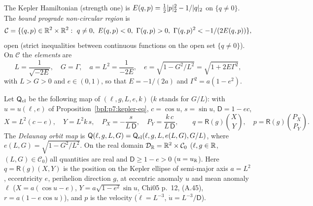 \begin{definition}\label{bpI:p7:elements}
The Kepler Hamiltonian (strength one) is $E(q,p)=\tfrac12\lvert p\rvert_2^2-1/\lvert q\rvert_2$ on $\{q\ne0\}$. The \emph{bound prograde non-circular region} is
\[
\mathcal C=\{(q,p)\in\R^2\times\R^2:\ q\ne0,\ E(q,p)<0,\ \Gamma(q,p)>0,\ \Gamma(q,p)^2<-1/(2E(q,p))\},
\]
open (strict inequalities between continuous functions on the open set $\{q\ne0\}$). On $\mathcal C$ the \emph{elements} are
\[
L=\frac1{\sqrt{-2E}},\quad G=\Gamma,\quad a=L^2=\frac1{-2E},\quad e=\sqrt{1-G^2/L^2}=\sqrt{1+2E\Gamma^2},
\]
with $L>G>0$ and $e\in(0,1)$,
so that $E=-1/(2a)$ and $\Gamma^2=a(1-e^2)$.
\end{definition}

\begin{definition}\label{bpI:p7:orbit-maps}
Let $\mathsf Q_{\rm el}$ be the following map of $(\ell,g,L,e,k)$ ($k$ stands for $G/L$): with $u=u(\ell,e)$ of Proposition~\ref{bpI:p7:kepler-eq}, $c=\cos u$, $s=\sin u$, $\mathsf D=1-ec$,
\[
X=L^2(c-e),\quad Y=L^2k\,s,\quad P_X=-\frac{s}{L\,\mathsf D},\quad P_Y=\frac{k\,c}{L\,\mathsf D},\qquad
q=\mathsf R(g)\binom XY,\quad p=\mathsf R(g)\binom{P_X}{P_Y}.
\]
The \emph{Delaunay orbit map} is $\mathsf Q(\ell,g,L,G)=\mathsf Q_{\rm el}(\ell,g,L,e(L,G),G/L)$, where $e(L,G)=\sqrt{1-G^2/L^2}$. On the real domain $\mathcal D_{\mathbb{R}}=\mathbb{R}^2\times\mathcal C_0$ ($\ell,g\in\mathbb{R}$, $(L,G)\in\mathcal C_0$) all quantities are real
and $\mathsf D\ge1-e>0$ ($u=u_{\mathbb{R}}$). Here $q=\mathsf R(g)(X,Y)$ is the position on the Kepler ellipse of semi-major axis $a=L^2$, eccentricity $e$, perihelion direction $g$, at eccentric anomaly $u$ and mean anomaly $\ell$ ($X=a(\cos u-e)$, $Y=a\sqrt{1-e^2}\sin u$, Chi05 p.~12, (A.45), $r=a(1-e\cos u)$), and $p$ is the velocity ($\dot\ell=L^{-3}$,
$\dot u=L^{-3}/\mathsf D$).
\end{definition}

